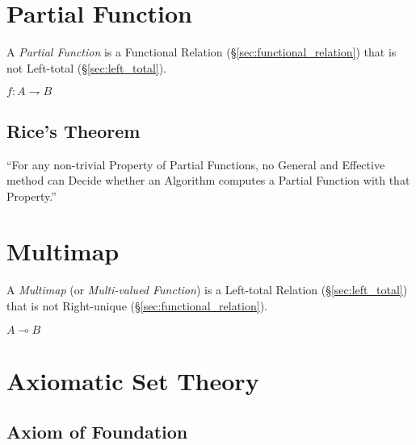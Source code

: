 \section{Partial Function}\label{sec:partial_function}

A \emph{Partial Function} is a Functional Relation
(\S\ref{sec:functional_relation}) that is not Left-total
(\S\ref{sec:left_total}).

$f : A \rightharpoondown B$



\subsection{Rice's Theorem}\label{sec:rices_theorem}

``For any non-trivial Property of Partial Functions, no General and
Effective method can Decide whether an Algorithm computes a Partial
Function with that Property.''



\section{Multimap}\label{sec:multimap}

A \emph{Multimap} (or \emph{Multi-valued Function}) is a Left-total
Relation (\S\ref{sec:left_total}) that is not Right-unique
(\S\ref{sec:functional_relation}).

$A \multimap B$



\section{Axiomatic Set Theory}\label{sec:axiomatic_set_theory}

\subsection{Axiom of Foundation}\label{sec:foundation_axiom}

